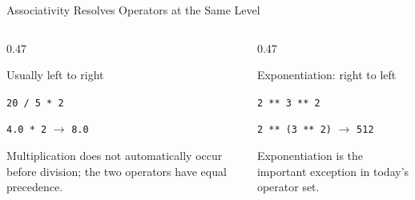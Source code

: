 \documentclass[aspectratio=169,10pt]{beamer}
\begin{document}
\begin{frame}{Associativity Resolves Operators at the Same Level}

  \begin{columns}[T,onlytextwidth]

    \begin{column}{0.47\textwidth}

      \begin{block}{Usually left to right}

        \texttt{20 / 5 * 2}

        \vspace{0.08in}

        \texttt{4.0 * 2} $\rightarrow$ \texttt{8.0}

      \end{block}

      Multiplication does not automatically occur before division; the two operators have equal precedence.

    \end{column}

    \begin{column}{0.47\textwidth}

      \begin{block}{Exponentiation: right to left}

        \texttt{2 ** 3 ** 2}

        \vspace{0.08in}

        \texttt{2 ** (3 ** 2)} $\rightarrow$ \texttt{512}

      \end{block}

      Exponentiation is the important exception in today's operator set.

    \end{column}

  \end{columns}

\end{frame}
\end{document}
